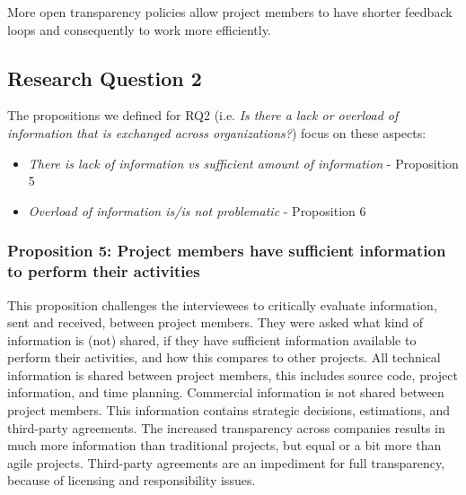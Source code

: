  More open transparency policies allow project members to have shorter feedback loops and consequently to work more efficiently.

\subsection{Research Question 2}\label{sec:ResearchQuestion2}

The propositions we defined for  
RQ2 (i.e. {\em Is there a lack or overload of information that is exchanged across organizations?}) focus on these aspects:

\begin{itemize}
\item {\em There is lack of information vs sufficient amount of information} - Proposition 5 %
\item {\em Overload of information is/is not problematic} - Proposition 6
\end{itemize}

\vspace{.2cm}
\subsubsection{Proposition 5: Project members have sufficient information to perform their activities}

%
%
%

This proposition challenges the interviewees to critically evaluate information, sent and received, between project members. They were asked what kind of information is (not) shared, if they have sufficient information available to perform their activities, and how this compares to other projects. All technical information is shared between project members, this includes source code, project information, and time planning. Commercial information is not shared between project members. This information contains strategic decisions, estimations, and third-party agreements. The increased transparency across companies results in much more information than traditional projects, but equal or a bit more than agile projects. Third-party agreements are an impediment for full transparency, because of licensing and responsibility issues.

